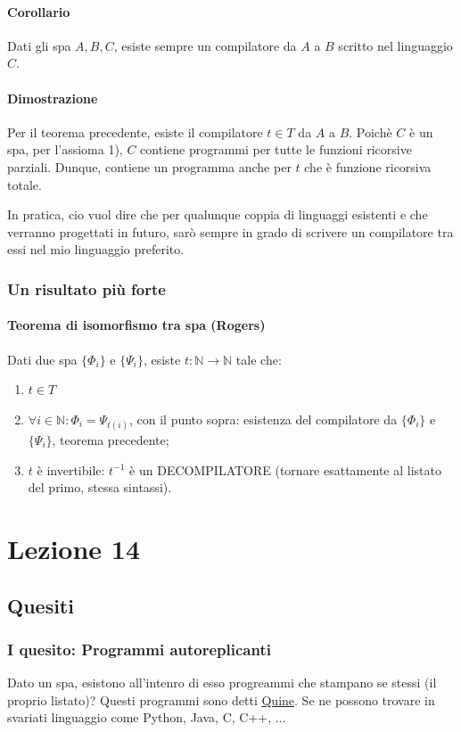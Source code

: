 \documentclass{article}
\begin{document}
\paragraph{Corollario} Dati gli spa $A,B,C$, esiste sempre un compilatore da $A$ a $B$ scritto nel linguaggio $C$.
\paragraph{Dimostrazione}
Per il teorema precedente, esiste il compilatore $t \in T$ da $A$ a $B$. Poichè $C$ è un spa, per l'assioma 1), $C$ contiene programmi per tutte le funzioni ricorsive parziali. Dunque, contiene un programma anche per $t$ che è funzione ricorsiva totale.



In pratica, cio vuol dire che per qualunque coppia di linguaggi esistenti e che verranno progettati in futuro, sarò sempre in grado di scrivere un compilatore tra essi nel mio linguaggio preferito.

\subsubsection{Un risultato più forte}
\paragraph{Teorema di isomorfismo tra spa (Rogers)}
Dati due spa $\{ \Phi_i \}$ e $\{ \Psi_i \}$, esiste $t:\mathbb{N} \rightarrow \mathbb{N}$ tale che:
\begin{enumerate}
	\item $t \in T$
	\item $\forall i \in \mathbb{N}:\Phi_i=\Psi_{t(i)}$, con il punto sopra: esistenza del compilatore da $\{ \Phi_i \}$ e $\{ \Psi_i \}$, teorema precedente;
	\item $t$ è invertibile: $t^{-1}$ è un DECOMPILATORE (tornare esattamente al listato del primo, stessa sintassi).
\end{enumerate}


\section{Lezione 14}
\subsection{Quesiti}
\subsubsection{I quesito: Programmi autoreplicanti}
Dato un spa, esistono all'intenro di esso progreammi che stampano se stessi (il proprio listato)?
Questi programmi sono detti \underline{Quine}. Se ne possono trovare in svariati linguaggio come Python, Java, C, C++, $\dots$
\end{document}

